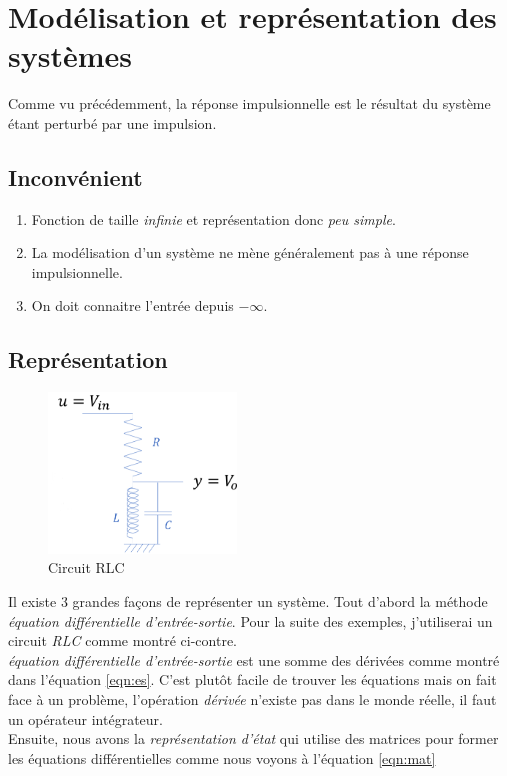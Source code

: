 \documentclass{report}
\begin{document}
\section{Modélisation et représentation des systèmes}
Comme vu précédemment, la réponse impulsionnelle est le résultat du système étant perturbé par une impulsion. 
\subsection{Inconvénient}
\begin{enumerate}
\item Fonction de taille \textit{infinie} et représentation donc \textit{peu simple}.
\item La modélisation d'un système ne mène généralement pas à une réponse impulsionnelle.
\item On doit connaitre l'entrée depuis $-\infty$.
\end{enumerate}


\subsection{Représentation}
\begin{figure}
\includegraphics[width=5cm]{img/RLC.png}
\caption{Circuit RLC}
\label{fig:RLC}
\end{figure}
Il existe 3 grandes façons de représenter un système. Tout d'abord la méthode \textit{équation différentielle d'entrée-sortie}. Pour la suite des exemples, j'utiliserai un circuit \textit{RLC} comme montré ci-contre.\\

\textit{équation différentielle d'entrée-sortie} est une somme des dérivées comme montré dans l'équation \ref{eqn:es}. C'est plutôt facile de trouver les équations mais on fait face à un problème, l'opération \textit{dérivée} n'existe pas dans le monde réelle, il faut un opérateur intégrateur.\\

Ensuite, nous avons la \textit{représentation d'état} qui utilise des matrices pour former les équations différentielles comme nous voyons à l'équation \ref{eqn:mat}\\
\end{document}
